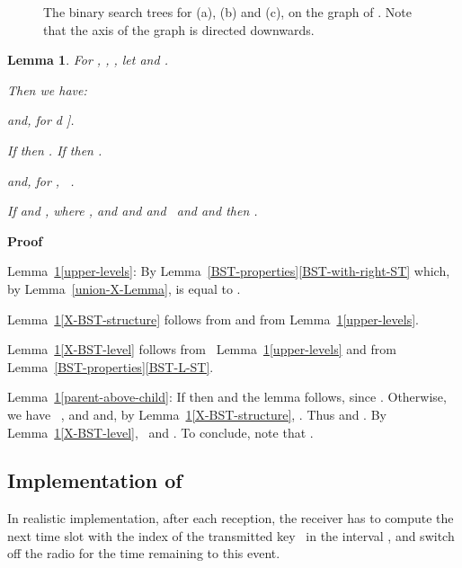 \documentclass{article}
\newenvironment{enumeratealpha}{\begin{enumerate}[a{\textup{)}}] }{\end{enumerate}}
\newenvironment{proof}{\noindent\textbf{Proof\ }}{\hspace*{\fill}\medskip}
\newtheorem{lemma}{Lemma}
\begin{document}
\begin{figure}[h]
  \caption{\label{BST-fig}The binary search trees for  (a),
   (b) and  (c), on the graph of . Note that the  axis of the graph is directed downwards.}
\end{figure}

\begin{lemma}
  \label{X-BST} For , , , let  and .
  
  Then we have:
  \begin{enumeratealpha}
    {\color{black} \item \label{upper-levels}  and, for
    d \in [[1, l]].}
    
    \item \label{X-BST-structure} If  then . If  then .
    
    {\color{black} \item \label{X-BST-level} and, for
    , \ .}
    
    \item \label{parent-above-child}If  and , where , and  and  and \ 
    and  and  then .
  \end{enumeratealpha}
\end{lemma}

\begin{proof}
  
  
  Lemma~\ref{X-BST}\ref{upper-levels}: By
  Lemma~\ref{BST-properties}\ref{BST-with-right-ST}  which, by Lemma~\ref{union-X-Lemma}, is equal to .
  
  Lemma~\ref{X-BST}\ref{X-BST-structure} follows from  and from
  Lemma~\ref{X-BST}\ref{upper-levels}.
  
  Lemma~\ref{X-BST}\ref{X-BST-level} follows from \
  Lemma~\ref{X-BST}\ref{upper-levels} and from
  Lemma~\ref{BST-properties}\ref{BST-L-ST}.
  
  Lemma~\ref{X-BST}\ref{parent-above-child}: If  then  and
  the lemma follows, since . Otherwise, we
  have \ ,  and  and, by
  Lemma~\ref{X-BST}\ref{X-BST-structure}, . Thus  and . By
  Lemma~\ref{X-BST}\ref{X-BST-level},  \ and . To conclude, note that . 
\end{proof}

\subsection{\label{Section-nsi}Implementation of }

In realistic implementation, after each reception, the receiver has to compute
the next time slot with the index of the transmitted key \ in the interval
, and switch off the radio for the time remaining to
this event.
\end{document}
